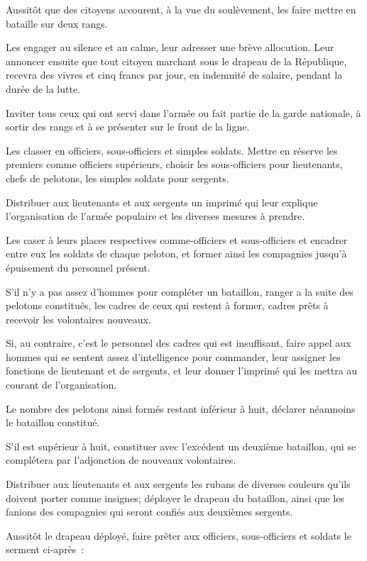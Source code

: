 \documentclass[french,twoside]{book} %
\begin{document}
\noindent Aussitôt que des citoyens accourent, à la vue du soulèvement, les faire mettre en bataille sur deux rangs.\par
Les engager au silence et au calme, leur adresser une brève allocution. Leur annoncer ensuite que tout citoyen marchant sous le drapeau de la République, recevra des vivres et cinq francs par jour, en indemnité de salaire, pendant la durée de la lutte.\par
Inviter tous ceux qui ont servi dans l’armée ou fait partie de la garde nationale, à sortir des rangs et à se présenter sur le front de la ligne.\par
Les classer en officiers, sous-officiers et simples soldats. Mettre en réserve les premiers comme officiers supérieurs, choisir les sous-officiers pour lieutenants, chefs de pelotons, les simples soldats pour sergents.\par
Distribuer aux lieutenants et aux sergents un imprimé qui leur explique l’organisation de l’armée populaire et les diverses mesures à prendre.\par
Les caser à leurs places respectives comme-officiers et sous-officiers et encadrer entre eux les soldats de chaque peloton, et former ainsi les compagnies jusqu’à épuisement du personnel présent.\par
S'il n’y a pas assez d’hommes pour compléter un bataillon, ranger a la suite des pelotons constitués, les cadres de ceux qui restent à former, cadres prêts à recevoir les volontaires nouveaux.\par
Si, au contraire, c’est le personnel des cadres qui est insuffisant, faire appel aux hommes qui se sentent assez d’intelligence pour commander, leur assigner les fonctions de lieutenant et de sergents, et leur donner l’imprimé qui les mettra au courant de l’organisation.\par
Le nombre des pelotons ainsi formés restant inférieur à huit, déclarer néanmoins le bataillon constitué.\par
S'il est supérieur à huit, constituer avec l’excédent un deuxième bataillon, qui se complétera par l’adjonction de nouveaux volontaires.\par
Distribuer aux lieutenants et aux sergents les rubans de diverses couleurs qu’ils doivent porter comme insignes; déployer le drapeau du bataillon, ainsi que les fanions des compagnies qui seront confiés aux deuxièmes sergents.\par
Aussitôt le drapeau déployé, faire prêter aux officiers, sous-officiers et soldats le serment ci-après :\par
\end{document}
